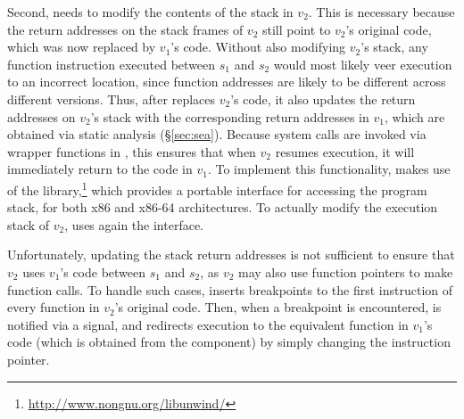 

Second, \rem needs to modify the contents of the stack in $v_2$.  This
is necessary because the return addresses on the stack frames of $v_2$
still point to $v_2$'s original code, which was now replaced by
$v_1$'s code.  Without also modifying $v_2$'s stack, any
function  instruction executed between $s_1$ and $s_2$
would most likely veer execution to an incorrect location, since
function addresses are likely to be different across different
versions.  Thus, after \rem replaces $v_2$'s code, it also updates the
return addresses on $v_2$'s stack with the corresponding return
addresses in $v_1$, which are obtained via static analysis
(\S\ref{sec:sea}).  Because system calls are invoked via wrapper
functions in , this ensures that when $v_2$ resumes
execution, it will immediately return to the code in $v_1$.
%
To implement this functionality, \rem makes use of
the 
library,\footnote{\url{http://www.nongnu.org/libunwind/}} which provides a
portable interface for accessing the program stack, for both x86 and
x86-64 architectures. To actually modify the execution stack of
$v_2$, \rem uses again the \ptrace interface.


Unfortunately, updating the stack return addresses is not sufficient
to ensure that $v_2$ uses $v_1$'s code between $s_1$ and $s_2$, as
$v_2$ may also use function pointers to make function calls.
To handle such cases, \rem inserts breakpoints to the first
instruction of every function in $v_2$'s original code.  Then, when a
breakpoint is encountered, \rem is notified via a 
signal, and redirects execution to the equivalent function in $v_1$'s
code (which is obtained from the \sea component) by simply changing
the instruction pointer.

